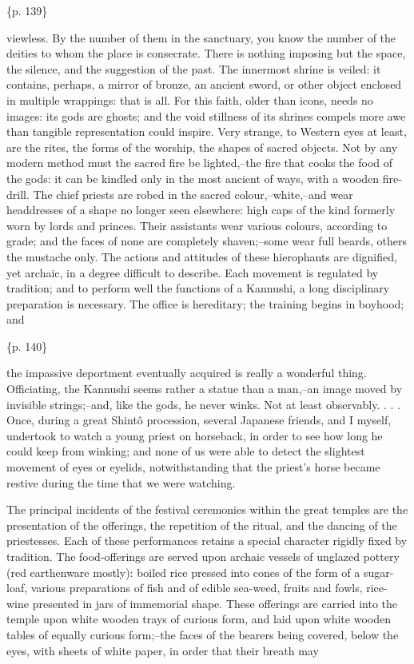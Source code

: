 \{p. 139\}

viewless. By the number of them in the sanctuary, you know the number of the deities to whom the place is consecrate. There is nothing imposing but the space, the silence, and the suggestion of the past. The innermost shrine is veiled: it contains, perhaps, a mirror of bronze, an ancient sword, or other object enclosed in multiple wrappings: that is all. For this faith, older than icons, needs no images: its gods are ghosts; and the void stillness of its shrines compels more awe than tangible representation could inspire. Very strange, to Western eyes at least, are the rites, the forms of the worship, the shapes of sacred objects. Not by any modern method must the sacred fire be lighted,--the fire that cooks the food of the gods: it can be kindled only in the most ancient of ways, with a wooden fire-drill. The chief priests are robed in the sacred colour,--white,--and wear headdresses of a shape no longer seen elsewhere: high caps of the kind formerly worn by lords and princes. Their assistants wear various colours, according to grade; and the faces of none are completely shaven;--some wear full beards, others the mustache only. The actions and attitudes of these hierophants are dignified, yet archaic, in a degree difficult to describe. Each movement is regulated by tradition; and to perform well the functions of a Kannushi, a long disciplinary preparation is necessary. The office is hereditary; the training begins in boyhood; and

\{p. 140\}

the impassive deportment eventually acquired is really a wonderful thing. Officiating, the Kannushi seems rather a statue than a man,--an image moved by invisible strings;--and, like the gods, he never winks. Not at least observably. . . . Once, during a great Shintô procession, several Japanese friends, and I myself, undertook to watch a young priest on horseback, in order to see how long he could keep from winking; and none of us were able to detect the slightest movement of eyes or eyelids, notwithstanding that the priest's horse became restive during the time that we were watching.

The principal incidents of the festival ceremonies within the great temples are the presentation of the offerings, the repetition of the ritual, and the dancing of the priestesses. Each of these performances retains a special character rigidly fixed by tradition. The food-offerings are served upon archaic vessels of unglazed pottery (red earthenware mostly): boiled rice pressed into cones of the form of a sugar-loaf, various preparations of fish and of edible sea-weed, fruits and fowls, rice-wine presented in jars of immemorial shape. These offerings are carried into the temple upon white wooden trays of curious form, and laid upon white wooden tables of equally curious form;--the faces of the bearers being covered, below the eyes, with sheets of white paper, in order that their breath may

